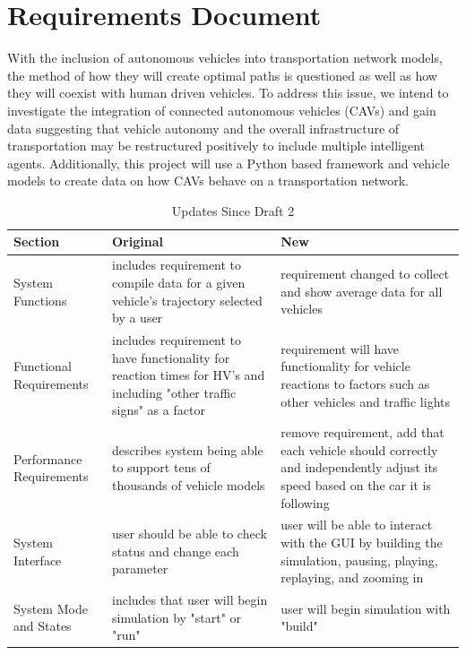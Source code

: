 \documentclass[onecolumn, draftclsnofoot,10pt, compsoc]{IEEEtran}
\begin{document}
\section{Requirements Document}
With the inclusion of autonomous vehicles into transportation network models, the method of how they will create optimal paths is questioned as well as how they will coexist with human driven vehicles.
To address this issue, we intend to investigate the integration of connected autonomous vehicles (CAVs) and gain data suggesting that vehicle autonomy and the overall infrastructure of transportation may be restructured positively to include multiple intelligent agents.
Additionally, this project will use a Python based framework and vehicle models to create data on how CAVs behave on a transportation network.
\begin{table}[h]
\caption{Updates Since Draft 2}
\begin{tabular}{|l|p{2in}|p{2in}|}
\hline
Section                  & Original  & New \\ \hline
System Functions         & includes requirement to compile data for a given vehicle's trajectory selected by a user                               & requirement changed to collect and show average data for all vehicles                                                          \\ \hline
Functional Requirements  & includes requirement to have functionality for reaction times for HV's and including "other traffic signs" as a factor & requirement will have functionality for vehicle reactions to factors such as other vehicles and traffic lights                 \\ \hline
Performance Requirements & describes system being able to support tens of thousands of vehicle models                                             & remove requirement, add that each vehicle should correctly and independently adjust its speed based on the car it is following \\ \hline
System Interface         & user should be able to check status and change each parameter                                                          & user will be able to interact with the GUI by building the simulation, pausing, playing, replaying, and zooming in             \\ \hline
System Mode and States   & includes that user will begin simulation by "start" or "run"                                                           & user will begin simulation with "build"                                                                                        \\ \hline

\end{tabular}
\end{table}
\end{document}
